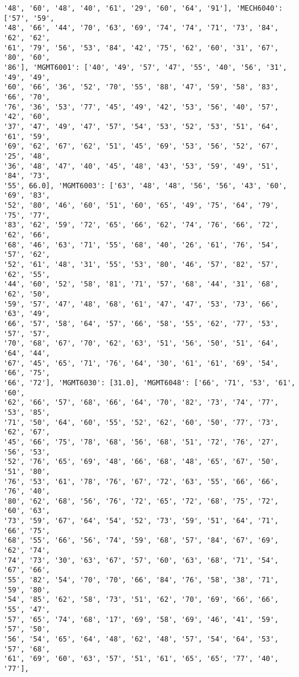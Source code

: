 \documentclass[11pt]{article}
\begin{document}
\begin{Verbatim}[commandchars=\\\{\}]
'48', '60', '48', '40', '61', '29', '60', '64', '91'], 'MECH6040': ['57', '59',
'48', '66', '44', '70', '63', '69', '74', '74', '71', '73', '84', '62', '62',
'61', '79', '56', '53', '84', '42', '75', '62', '60', '31', '67', '80', '60',
'86'], 'MGMT6001': ['40', '49', '57', '47', '55', '40', '56', '31', '49', '49',
'60', '66', '36', '52', '70', '55', '88', '47', '59', '58', '83', '66', '70',
'76', '36', '53', '77', '45', '49', '42', '53', '56', '40', '57', '42', '60',
'37', '47', '49', '47', '57', '54', '53', '52', '53', '51', '64', '61', '59',
'69', '62', '67', '62', '51', '45', '69', '53', '56', '52', '67', '25', '48',
'36', '48', '47', '40', '45', '48', '43', '53', '59', '49', '51', '84', '73',
'55', 66.0], 'MGMT6003': ['63', '48', '48', '56', '56', '43', '60', '69', '83',
'52', '80', '46', '60', '51', '60', '65', '49', '75', '64', '79', '75', '77',
'83', '62', '59', '72', '65', '66', '62', '74', '76', '66', '72', '62', '66',
'68', '46', '63', '71', '55', '68', '40', '26', '61', '76', '54', '57', '62',
'52', '61', '48', '31', '55', '53', '80', '46', '57', '82', '57', '62', '55',
'44', '60', '52', '58', '81', '71', '57', '68', '44', '31', '68', '62', '50',
'59', '57', '47', '48', '68', '61', '47', '47', '53', '73', '66', '63', '49',
'66', '57', '58', '64', '57', '66', '58', '55', '62', '77', '53', '57', '57',
'70', '68', '67', '70', '62', '63', '51', '56', '50', '51', '64', '64', '44',
'67', '45', '65', '71', '76', '64', '30', '61', '61', '69', '54', '66', '75',
'66', '72'], 'MGMT6030': [31.0], 'MGMT6048': ['66', '71', '53', '61', '60',
'62', '66', '57', '68', '66', '64', '70', '82', '73', '74', '77', '53', '85',
'71', '50', '64', '60', '55', '52', '62', '60', '50', '77', '73', '62', '67',
'45', '66', '75', '78', '68', '56', '68', '51', '72', '76', '27', '56', '53',
'52', '76', '65', '69', '48', '66', '68', '48', '65', '67', '50', '51', '80',
'76', '53', '61', '78', '76', '67', '72', '63', '55', '66', '66', '76', '40',
'80', '62', '68', '56', '76', '72', '65', '72', '68', '75', '72', '60', '63',
'73', '59', '67', '64', '54', '52', '73', '59', '51', '64', '71', '66', '75',
'68', '55', '66', '56', '74', '59', '68', '57', '84', '67', '69', '62', '74',
'74', '73', '30', '63', '67', '57', '60', '63', '68', '71', '54', '67', '66',
'55', '82', '54', '70', '70', '66', '84', '76', '58', '38', '71', '59', '80',
'54', '85', '62', '58', '73', '51', '62', '70', '69', '66', '66', '55', '47',
'57', '65', '74', '68', '17', '69', '58', '69', '46', '41', '59', '57', '50',
'56', '54', '65', '64', '48', '62', '48', '57', '54', '64', '53', '57', '68',
'61', '69', '60', '63', '57', '51', '61', '65', '65', '77', '40', '77'],

\end{Verbatim}
\end{document}
